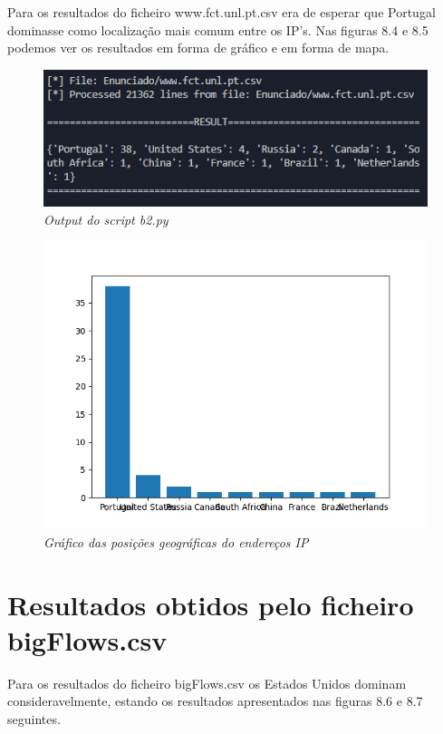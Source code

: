 Para os resultados do ficheiro www.fct.unl.pt.csv era de esperar que Portugal dominasse como localização mais comum entre os IP's. Nas figuras 8.4 e 8.5 podemos ver os resultados em forma de gráfico e em forma de mapa. 

\begin{figure}[h!]
    \label{high}
    \centering
    \includegraphics[width=1\textwidth]{Images/b2/b2_a.png}
    \caption{\textit{Output do script b2.py}}
\end{figure}

\begin{figure}[h!]
    \label{high}
    \centering
    \includegraphics[width=1\textwidth]{Images/b2/b2_1.png}
    \caption{\textit{Gráfico das posições geográficas do endereços IP}}
\end{figure}

\clearpage

\section{Resultados obtidos pelo ficheiro bigFlows.csv}

Para os resultados do ficheiro bigFlows.csv os Estados Unidos dominam consideravelmente, estando os resultados apresentados nas figuras 8.6 e 8.7 seguintes.

